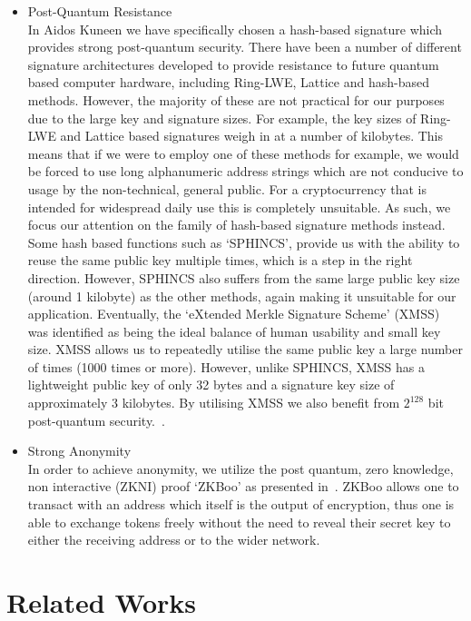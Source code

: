 \documentclass[a4paper,10pt,twocolumn]{article}
\begin{document}
\begin{itemize}
\item{Post-Quantum Resistance}\mbox{}\\ 
In Aidos Kuneen we have specifically chosen a hash-based signature which provides strong post-quantum security. There have been a 
number of different signature architectures developed to provide resistance to future quantum based computer hardware, including 
Ring-LWE, Lattice and hash-based methods. However, the majority of these are not practical for our purposes due to the large key and 
signature sizes. For example, the key sizes of Ring-LWE and Lattice based signatures weigh in at a number of kilobytes. This means that 
if we were to employ one of these methods for example, we would be forced to use long alphanumeric address strings which are not 
conducive to usage by the non-technical, general public. For a cryptocurrency that is intended for widespread daily use this is 
completely unsuitable. As such, we focus our attention on the family of hash-based signature methods instead. Some hash based functions 
such as `SPHINCS', provide us with the ability to reuse the same public key multiple times, which is a step in the right direction. 
However, SPHINCS also suffers from the same large public key size (around 1 kilobyte) as the other methods, again making it unsuitable 
for our application. Eventually, the `eXtended Merkle Signature Scheme' (XMSS) was identified as being the ideal balance of human 
usability and small key size. XMSS allows us to repeatedly utilise the same public key a large number of times (1000 times or more). 
However, unlike SPHINCS, XMSS has a lightweight public key of only 32 bytes and a signature key size of approximately 3 kilobytes. By utilising XMSS we also benefit from \( 2^{128} \) bit post-quantum security.~\cite{recom}.

\item{Strong Anonymity}\\ 
In order to achieve anonymity, we utilize the post quantum, zero knowledge, non interactive (ZKNI) proof `ZKBoo' as presented 
in~\cite{zkboo}. ZKBoo allows one to transact with an address which itself is the output of encryption, thus one is able to exchange 
tokens freely without the need to reveal their secret key to either the receiving address or to the wider network.
\end{itemize}

\section{Related Works}
\end{document}
